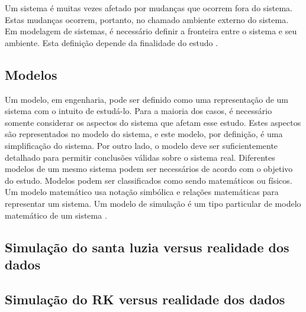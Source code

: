 Um sistema é muitas vezes afetado por mudanças que ocorrem fora do sistema. Estas mudanças ocorrem, portanto, no chamado ambiente externo do sistema. Em modelagem de sistemas, é necessário definir a fronteira entre o sistema e seu ambiente. Esta definição depende da finalidade do estudo \cite{miyagi2006introduccao}.

\subsection{Modelos}

Um modelo, em engenharia, pode ser definido como uma representação de um sistema com o intuito de estudá-lo. Para a maioria dos casos, é necessário somente considerar os aspectos do sistema que afetam esse estudo. Estes aspectos são representados no modelo do sistema, e este modelo, por definição, é uma simplificação do sistema. Por outro lado, o modelo deve ser suficientemente detalhado para permitir conclusões válidas sobre o sistema real. Diferentes modelos de um mesmo sistema podem ser necessários de acordo com o objetivo do estudo. Modelos podem ser classificados como sendo matemáticos ou físicos. Um modelo matemático usa notação simbólica e relações matemáticas para representar um sistema. Um modelo de simulação é um tipo particular de modelo matemático de um sistema \cite{miyagi2006introduccao}.






\subsection{Simulação do santa luzia versus realidade dos dados}

\subsection{Simulação do RK versus realidade dos dados}


